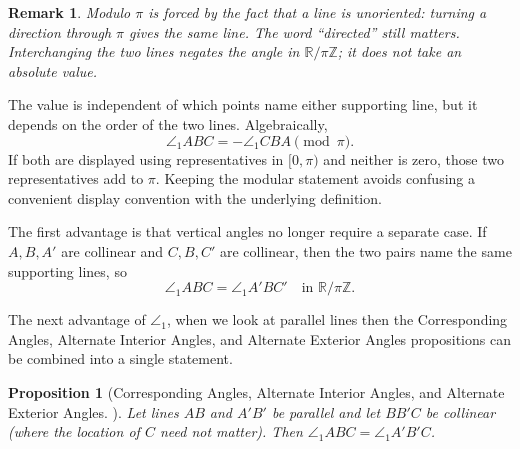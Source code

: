 \documentclass[reqno]{amsart}
\DeclareMathOperator{\1}{\textbf{1}}
\newtheorem{prop}[thm]{Proposition}
\newtheorem{remark}[thm]{Remark}
\begin{document}
\begin{remark}
    Modulo $\pi$ is forced by the fact that a line is unoriented: turning a
    direction through $\pi$ gives the same line.  The word ``directed'' still
    matters.  Interchanging the two lines negates the angle in
    $\mathbb{R}/\pi\mathbb{Z}$; it does not take an absolute value.
\end{remark}

The value is independent of which points name either supporting line, but it
depends on the order of the two lines.  Algebraically,
\[
  \angle_1ABC=-\angle_1CBA\pmod\pi.
\]
If both are displayed using representatives in $[0,\pi)$ and neither is zero,
those two representatives add to $\pi$.  Keeping the modular statement avoids
confusing a convenient display convention with the underlying definition.

The first advantage is that vertical angles no longer require a separate case.
If $A,B,A'$ are collinear and $C,B,C'$ are collinear, then the two pairs name
the same supporting lines, so
\[
    \angle_1 ABC=\angle_1 A'BC' \quad\text{in }\mathbb R/\pi\mathbb Z.
\]

The next advantage of $\angle_1$, when we look at parallel lines then the
Corresponding Angles, Alternate Interior Angles, and Alternate Exterior Angles
propositions can be combined into a single statement.

\begin{prop}[Corresponding Angles, Alternate Interior Angles, and Alternate
Exterior Angles. ]
    Let lines $AB$ and $A'B'$ be parallel and let $BB'C$ be collinear (where the
    location of $C$ need not matter). Then $\angle_1ABC=\angle_1A'B'C$.
\end{prop}
\end{document}
